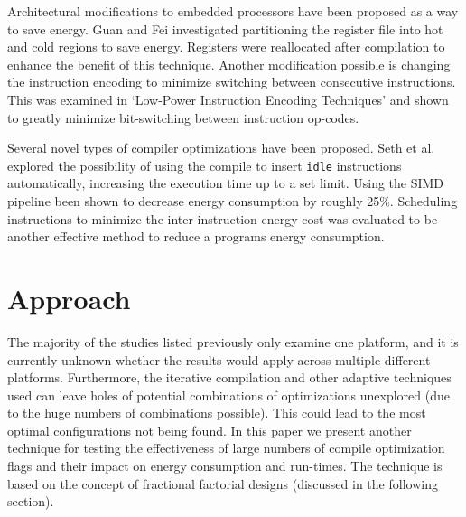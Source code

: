 \documentclass[twocolumn]{article}
\newcommand{\nsection}[1]{\section{\bfseries #1}}
\begin{document}

Architectural modifications to embedded processors have been proposed as a way to save energy. Guan and Fei investigated partitioning the register file\cite{RegisterFilePartitioning} into hot and cold regions to save energy. Registers were reallocated after compilation to enhance the benefit of this technique. Another modification possible is changing the instruction encoding to minimize switching between consecutive instructions. This was examined in `Low-Power Instruction Encoding Techniques'\cite{LowPowerInstructionEncodings} and shown to greatly minimize bit-switching between instruction op-codes.

Several novel types of compiler optimizations have been proposed. Seth et al.\cite{Seth2001} explored the possibility of using the compile to insert \texttt{idle} instructions automatically, increasing the execution time up to a set limit. Using the SIMD pipeline been shown to decrease energy consumption\cite{Ibrahim2009} by roughly 25\%. Scheduling instructions to minimize the inter-instruction energy cost was evaluated to be another effective method to reduce a programs energy consumption\cite{Parikh}.


\nsection{Approach}

The majority of the studies listed previously only examine one platform, and it is currently unknown whether the results would apply across multiple different platforms. Furthermore, the iterative compilation and other adaptive techniques used can leave holes of potential combinations of optimizations unexplored (due to the huge numbers of combinations possible). This could lead to the most optimal configurations not being found. In this paper we present another technique for testing the effectiveness of large numbers of compile optimization flags and their impact on energy consumption and run-times. The technique is based on the concept of fractional factorial designs (discussed in the following section).
\end{document}
